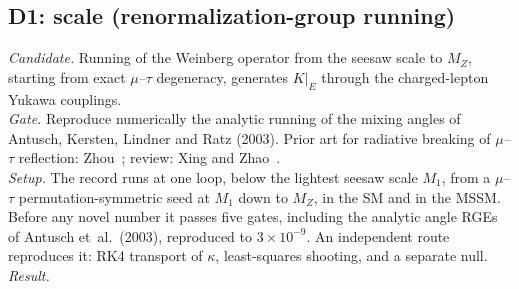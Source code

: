 \subsection{D1: scale (renormalization-group running)}\label{sec:D1}
\emph{Candidate.} Running of the Weinberg operator from the seesaw scale to $M_Z$, starting
from exact $\mu$--$\tau$ degeneracy, generates $K|_E$ through the charged-lepton Yukawa
couplings.\\
\emph{Gate.} Reproduce numerically the analytic running of the mixing angles of
Antusch, Kersten, Lindner and Ratz (2003). Prior art for radiative breaking of $\mu$--$\tau$ reflection:
Zhou~\cite{zhou2014}; review: Xing and Zhao~\cite{xingzhao2016}.\\
\emph{Setup.} The record runs at one loop, below the lightest seesaw scale $M_1$, from a
$\mu$--$\tau$ permutation-symmetric seed at $M_1$ down to $M_Z$, in the SM and in the MSSM. Before
any novel number it passes five gates, including the analytic angle RGEs of
Antusch et~al.\ (2003), reproduced to $3\times10^{-9}$. An independent route reproduces it:
RK4 transport of $\kappa$, least-squares shooting, and a separate null.\\
\emph{Result.}
